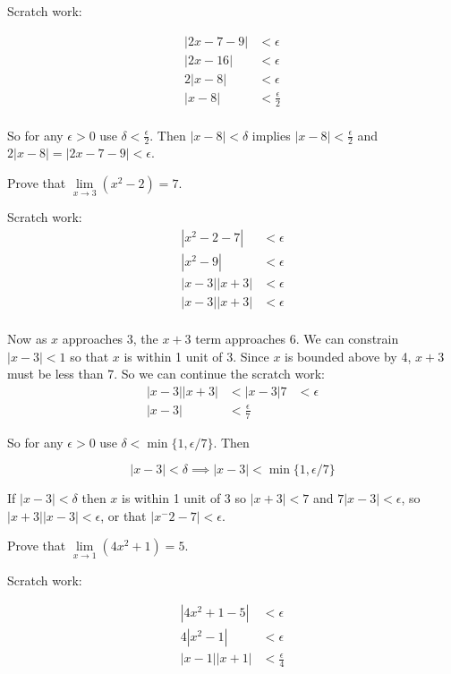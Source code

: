 \documentclass{article}
\begin{document}
Scratch work:

\begin{align*}
  |2x - 7 - 9| & < \epsilon           \\
  |2x - 16|    & < \epsilon           \\
  2|x - 8|     & < \epsilon           \\
  |x - 8|      & < \frac{\epsilon}{2} \\
\end{align*}

So for any $\epsilon > 0$ use $\delta < \frac{\epsilon}{2}$. Then $|x - 8| < \delta$ implies $|x - 8| < \frac{\epsilon}{2}$ and $2|x - 8| = |2x - 7 -9| < \epsilon$.

\begin{problem}
Prove that $\lim\limits_{x\to 3} (x^2 - 2) = 7$.
\end{problem}

Scratch work:
\begin{align*}
  |x^2 - 2 - 7|  & < \epsilon \\
  |x^2 - 9|      & < \epsilon \\
  |x - 3||x + 3| & < \epsilon \\
  |x - 3||x + 3| & < \epsilon \\
\end{align*}

Now as $x$ approaches 3, the $x + 3$ term approaches 6. We can constrain $|x - 3| < 1$ so that $x$ is within 1 unit of 3. Since $x$ is bounded above by 4, $x + 3$ must be less than 7. So we can continue the scratch work:
\begin{align*}
  |x - 3||x + 3| & < |x - 3|7           & < \epsilon \\
  |x - 3|        & < \frac{\epsilon}{7}
\end{align*}

So for any $\epsilon > 0$ use $\delta < \min\{1, \epsilon/7\}$. Then

$$|x - 3| < \delta \implies |x - 3| < \min\{1, \epsilon/7\}$$

If $|x - 3| < \delta$ then $x$ is within 1 unit of 3 so $|x + 3| < 7$ and $7|x - 3| < \epsilon$, so $|x + 3||x - 3| < \epsilon$, or that $|x^ - 2 - 7| < \epsilon$.

\begin{problem}
Prove that $\lim\limits_{x \to 1} (4x^2 + 1) = 5$.
\end{problem}

Scratch work:

\begin{align*}
  |4x^2 + 1 - 5| & < \epsilon           \\
  4|x^2 - 1|     & < \epsilon           \\
  |x - 1||x + 1| & < \frac{\epsilon}{4}
\end{align*}
\end{document}
